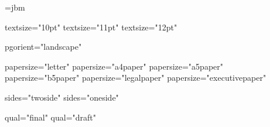 \msi@inline@proc={jbm}







\def\msi@stylesheets{\msitag{<?xml-stylesheet href="css/my.css" type="text/css"?>}\br}


\def\@brace#1{\char123\relax#1\char125\relax}

\def\br{\msitag{^^0a}}


\newif\ifmsi@firstopt
\msi@firstopttrue


\expandafter\def\csname 10ptAttrib\endcsname{textsize="10pt"}
\expandafter\def\csname 11ptAttrib\endcsname{textsize="11pt"}
\expandafter\def\csname 12ptAttrib\endcsname{textsize="12pt"}

\expandafter\def\csname landscapeAttrib\endcsname{pgorient="landscape"}

\expandafter\def\csname letterpaperAttrib\endcsname{papersize="letter"}
\expandafter\def\csname a4paperAttrib\endcsname{papersize="a4paper"}
\expandafter\def\csname a5paperAttrib\endcsname{papersize="a5paper"}
\expandafter\def\csname b5paperAttrib\endcsname{papersize="b5paper"}
\expandafter\def\csname legalpaperAttrib\endcsname{papersize="legalpaper"}
\expandafter\def\csname executivepaperAttrib\endcsname{papersize="executivepaper"}

\expandafter\def\csname twosideAttrib\endcsname{sides="twoside"}
\expandafter\def\csname onesideAttrib\endcsname{sides="oneside"}

\expandafter\def\csname finalAttrib\endcsname{qual="final"}
\expandafter\def\csname draftAttrib\endcsname{qual="draft"}

